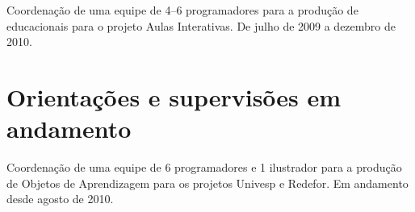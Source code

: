 \begin{compactitem}
	\item Coordenação de uma equipe de 4--6 programadores para a produção de  educacionais para o projeto Aulas Interativas. De julho de 2009 a dezembro de 2010.
\end{compactitem}

\section*{Orientações e supervisões em andamento}

\begin{compactitem}
	\item Coordenação de uma equipe de 6 programadores e 1 ilustrador para a produção de Objetos de Aprendizagem para os projetos Univesp e Redefor. Em andamento desde agosto de 2010.
\end{compactitem}


